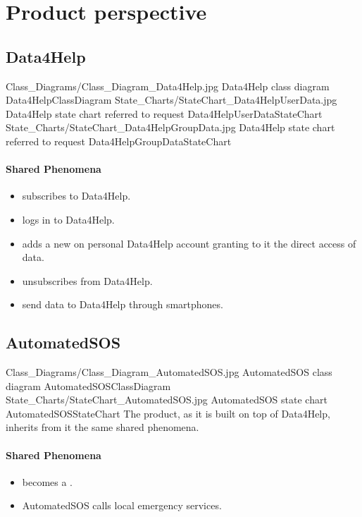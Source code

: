 \documentclass[../../rasd.tex]{subfiles}
\begin{document}
	
	\section{Product perspective}

		\subsection{Data4Help}

			\image {10cm} {Class_Diagrams/Class_Diagram_Data4Help.jpg} {Data4Help class diagram} {Data4HelpClassDiagram}
			\image {10cm} {State_Charts/StateChart_Data4HelpUserData.jpg} {Data4Help state chart referred to  request} {Data4HelpUserDataStateChart}
			\image {10cm} {State_Charts/StateChart_Data4HelpGroupData.jpg} {Data4Help state chart referred to  request} {Data4HelpGroupDataStateChart}

			\paragraph{Shared Phenomena}
			\begin{itemize}
				\item {} subscribes to Data4Help.
				\item {} logs in to Data4Help.
				\item {} adds a new  on personal Data4Help account granting to it the direct access of data.
				\item {} unsubscribes from Data4Help.
				\item {} send data to Data4Help through smartphones.
			\end{itemize}

		\subsection{AutomatedSOS}

			\image {10cm} {Class_Diagrams/Class_Diagram_AutomatedSOS.jpg} {AutomatedSOS class diagram} {AutomatedSOSClassDiagram}
			\image {10cm} {State_Charts/StateChart_AutomatedSOS.jpg} {AutomatedSOS state chart} {AutomatedSOSStateChart}
			The product, as it is built on top of Data4Help, inherits from it the same shared phenomena.

			\paragraph{Shared Phenomena}
			\begin{itemize}
				\item {} becomes a .
				\item AutomatedSOS calls local emergency services.
			\end{itemize}
\end{document}
